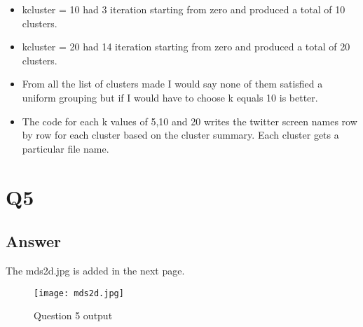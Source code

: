 \documentclass[12pt]{article}
\begin{document}
\begin{itemize}
\item kcluster = 10 had 3 iteration starting from zero and produced a total of 10 clusters. 



\item kcluster = 20 had 14 iteration starting from zero and produced a total of 20 clusters. 



\item From all the list of clusters made I would say none of them satisfied a uniform grouping but if I would have to choose k equals 10 is better.

\item The code for each k values of 5,10 and 20 writes the twitter screen names row by row for each cluster based on the cluster summary. Each cluster gets a particular file name.



\end{itemize}

\section*{Q5}

\subsection*{Answer}
The mds2d.jpg is added in the next page.
\begin{figure}[h]
\centering
\texttt{[image: mds2d.jpg]}
\caption{ Question 5 output}
\label{fig}
\end{figure}
\end{document}
